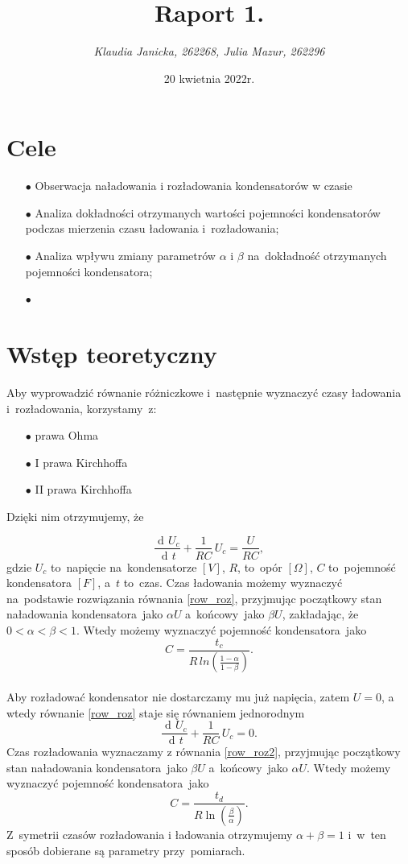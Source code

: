 \documentclass[12pt]{mwart}
\title{\textbf{Raport 1.}}
\author{\fontsize{12pt}{12pt}\selectfont \emph{Klaudia Janicka, 262268, Julia Mazur, 262296}}
\date{20 kwietnia 2022r.}
\DeclareMathOperator{\diff}{d\!}
\begin{document}
	\maketitle
	\section{Cele}
	\begin{itemize}
		\item[$\bullet$] Obserwacja naładowania i rozładowania kondensatorów w czasie
		\item[$\bullet$] Analiza dokładności otrzymanych wartości pojemności kondensatorów podczas mierzenia czasu ładowania i~rozładowania;
		\item[$\bullet$] Analiza wpływu zmiany parametrów $\alpha$ i $\beta$ na~dokładność otrzymanych pojemności kondensatora;
		\item[$\bullet$] %
	\end{itemize}
	\section{Wstęp teoretyczny}
	\noindent Aby wyprowadzić równanie różniczkowe i~następnie wyznaczyć czasy ładowania i~rozładowania, korzystamy~z:
	\begin{itemize}
		\item[$\bullet$] prawa Ohma
		\item[$\bullet$] I prawa Kirchhoffa
		\item[$\bullet$] II prawa Kirchhoffa
	\end{itemize}
	Dzięki nim otrzymujemy, że 
	
	\begin{equation}\label{row_roz}
		\frac{\diff U_{c}}{\diff t} +\frac{1}{RC}\, U_{c}=\frac{U}{RC},
	\end{equation}
	gdzie $U_{c}$ to~napięcie na~kondensatorze $\left[V\right]$, $R$, to~opór $\left[\Omega\right]$, $C$ to~pojemność kondensatora $\left[F\right]$, a~$t$ to~czas.
	Czas ładowania możemy wyznaczyć na~podstawie rozwiązania równania \eqref{row_roz}, przyjmując początkowy stan naładowania kondensatora~jako $\alpha U$ a~końcowy~jako $\beta U$, zakładając, że~$0 < \alpha < \beta < 1$. Wtedy możemy wyznaczyć pojemność kondensatora~jako $$C=\frac{t_{c}}{R\,ln\left(\frac{1-\alpha}{1-\beta}\right)}.$$\label{poj_lad}
	\phantom{a}\\
	Aby rozładować kondensator nie dostarczamy mu już napięcia, zatem $U = 0$, a wtedy równanie \eqref{row_roz} staje się równaniem jednorodnym
	\begin{equation}\label{row_roz2}
		\frac{\diff U_{c}}{\diff t} +\frac{1}{RC}\, U_{c}=0.
	\end{equation}
	Czas rozładowania wyznaczamy z równania \eqref{row_roz2}, przyjmując początkowy stan naładowania kondensatora~jako $\beta U$ a~końcowy~jako $\alpha U$. Wtedy możemy wyznaczyć pojemność kondensatora~jako
	$$C=\frac{t_d}{R\ln\left({\frac{\beta}{\alpha}}\right)}.$$
	Z~symetrii czasów rozładowania i ładowania otrzymujemy $\alpha+\beta=1$ i~w~ten sposób dobierane są parametry przy~pomiarach.
\end{document}
